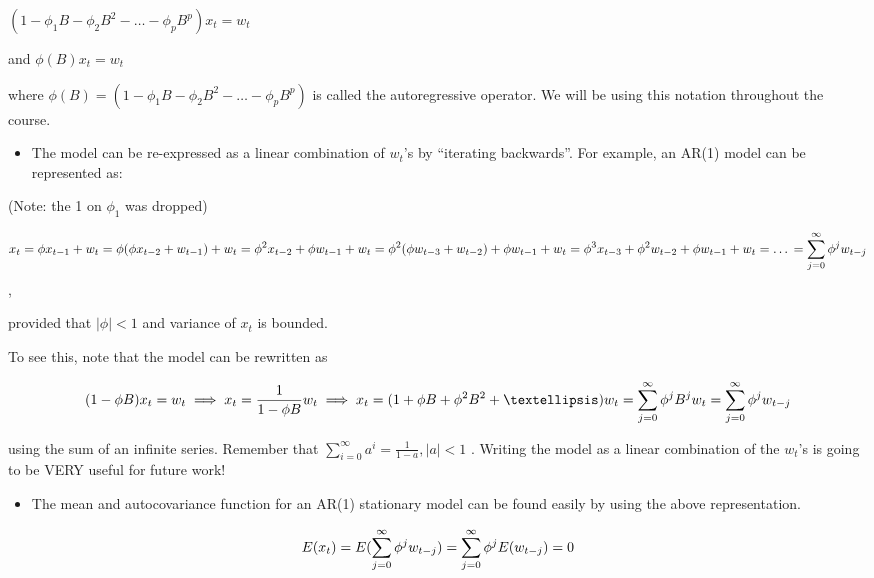 \documentclass[
]{book}
\providecommand{\tightlist}{%
  \setlength{\itemsep}{0pt}\setlength{\parskip}{0pt}}
\theoremstyle{definition}
\theoremstyle{definition}
\theoremstyle{definition}
\theoremstyle{definition}
\theoremstyle{remark}
\begin{document}
\((1-\phi_1B-\phi_2B^2-…-\phi_pB^p)x_t = w_t\)

and \(\phi(B)x_t = w_t\)

where \(\phi(B) = (1-\phi_1B-\phi_2B^2-…-\phi_pB^p)\) is called the autoregressive operator. We will be using this notation throughout the course.

\begin{itemize}
\tightlist
\item
  The model can be re-expressed as a linear combination of \(w_t\)'s by ``iterating backwards''. For example, an AR(1) model can be represented as:
\end{itemize}

(Note: the 1 on \(\phi_1\) was dropped)

\[x_t=\phi x_{t-1}+w_t\\
=\phi(\phi x_{t-2}+w_{t-1})+w_t\\
=\phi^2x_{t-2}+\phi w_{t-1}+w_t\\
=\phi^2(\phi w_{t-3}+w_{t-2})+\phi w_{t-1}+w_t\\
=\phi^3x_{t-3}+\phi^2w_{t-2}+\phi w_{t-1}+w_t\\
=\dots\\
=\sum_{j=0}^{\infty}\phi^jw_{t-j}\],

provided that \(|\phi|<1\) and variance of \(x_t\) is bounded.

To see this, note that the model can be rewritten as

\[(1-\phi B)x_t = w_t \\
\implies x_t=\frac{1}{1-\phi B}w_t\\
\implies x_t = (1+\phi B+\phi^2B^2+…)w_t \\
=\sum_{j=0}^{\infty}\phi^jB^jw_t\\
=\sum_{j=0}^{\infty}\phi^jw_{t-j}\]

using the sum of an infinite series. Remember that \(\sum_{i=0}^{\infty}a^i=\frac{1}{1-a},|a|<1\) . Writing the model as a linear combination of the \(w_t\)'s is going to be VERY useful for future work!

\begin{itemize}
\tightlist
\item
  The mean and autocovariance function for an AR(1) stationary model can be found easily by using the above representation.
\end{itemize}

\[E(x_t)=E(\sum_{j=0}^{\infty}\phi^jw_{t-j})\\
=\sum_{j=0}^{\infty}\phi^jE(w_{t-j})=0\]
\end{document}
